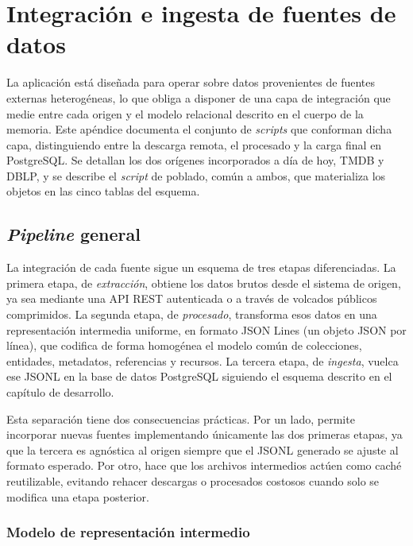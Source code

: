 \chapter{Integración e ingesta de fuentes de datos}
\label{Appendix:integracion}

La aplicación está diseñada para operar sobre datos provenientes de fuentes
externas heterogéneas, lo que obliga a disponer de una capa de integración
que medie entre cada origen y el modelo relacional descrito en el cuerpo de
la memoria. Este apéndice documenta el conjunto de \textit{scripts} que conforman
dicha capa, distinguiendo entre la descarga remota, el procesado y la
carga final en PostgreSQL. Se detallan los dos orígenes incorporados a
día de hoy, TMDB y DBLP, y se describe el \textit{script} de poblado, común a
ambos, que materializa los objetos en las cinco tablas del esquema.

\section{\textit{Pipeline} general}

La integración de cada fuente sigue un esquema de tres etapas
diferenciadas. La primera etapa, de \emph{extracción}, obtiene los datos
brutos desde el sistema de origen, ya sea mediante una API REST autenticada
o a través de volcados públicos comprimidos. La segunda etapa, de
\emph{procesado}, transforma esos datos en una representación intermedia
uniforme, en formato JSON Lines (un objeto JSON por línea), que codifica
de forma homogénea el modelo común de colecciones, entidades, metadatos,
referencias y recursos. La tercera etapa, de \emph{ingesta}, vuelca ese
JSONL en la base de datos PostgreSQL siguiendo el esquema descrito en el
capítulo de desarrollo.

Esta separación tiene dos consecuencias prácticas. Por un lado, permite
incorporar nuevas fuentes implementando únicamente las dos primeras
etapas, ya que la tercera es agnóstica al origen siempre que el JSONL
generado se ajuste al formato esperado. Por otro, hace que los archivos
intermedios actúen como caché reutilizable, evitando rehacer descargas o
procesados costosos cuando solo se modifica una etapa posterior.

\subsection*{Modelo de representación intermedio}

